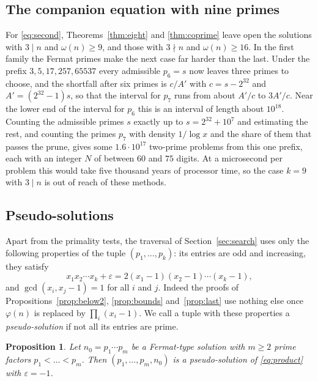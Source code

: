 \documentclass[11pt,reqno]{amsart}
\numberwithin{equation}{section}
\theoremstyle{plain}
\newtheorem{proposition}[theorem]{Proposition}
\theoremstyle{definition}
\theoremstyle{remark}
\begin{document}
\subsection{The companion equation with nine primes}
For \eqref{eq:second}, Theorems~\ref{thm:eight} and \ref{thm:coprime}
leave open the solutions with $3\mid n$ and $\omega(n)\ge9$, and those
with $3\nmid n$ and $\omega(n)\ge16$. In the first family the Fermat
primes make the next case far harder than the last. Under the prefix
$3,5,17,257,65537$ every admissible $p_6=s$ now leaves three primes to
choose, and the shortfall after six primes is $c/A'$ with $c=s-2^{32}$
and $A'=(2^{32}-1)s$, so that the interval for $p_7$ runs from about
$A'/c$ to $3A'/c$. Near the lower end of the interval for $p_6$ this
is an interval of length about $10^{18}$. Counting the admissible
primes $s$ exactly up to $s=2^{32}+10^7$ and estimating the rest, and
counting the primes $p_7$ with density $1/\log x$ and the share of
them that passes the prune, gives some $1.6\cdot10^{17}$ two-prime
problems from this one prefix, each with an integer $N$ of between
$60$ and $75$ digits. At a microsecond per problem this would take five
thousand years of processor time, so the case $k=9$ with $3\mid n$ is
out of reach of these methods.

\subsection{Pseudo-solutions}
Apart from the primality tests, the traversal of Section~\ref{sec:search}
uses only the following properties of the tuple $(p_1,\dots,p_k)$:
its entries are odd and increasing, they satisfy
\begin{equation}\label{eq:product}
  x_1x_2\cdots x_k+\varepsilon=2(x_1-1)(x_2-1)\cdots(x_k-1),
\end{equation}
and $\gcd(x_i,x_j-1)=1$ for all $i$ and $j$. Indeed the proofs of
Propositions~\ref{prop:below2}, \ref{prop:bounds} and~\ref{prop:last}
use nothing else once $\varphi(n)$ is replaced by
$\prod_i(x_i-1)$. We call a tuple with these properties a
\emph{pseudo-solution} if not all its entries are prime.

\begin{proposition}\label{prop:pseudo}
Let $n_0=p_1\cdots p_m$ be a Fermat-type solution with $m\ge2$ prime
factors $p_1<\dots<p_m$. Then $(p_1,\dots,p_m,n_0)$ is a
pseudo-solution of \eqref{eq:product} with $\varepsilon=-1$.
\end{proposition}
\end{document}
